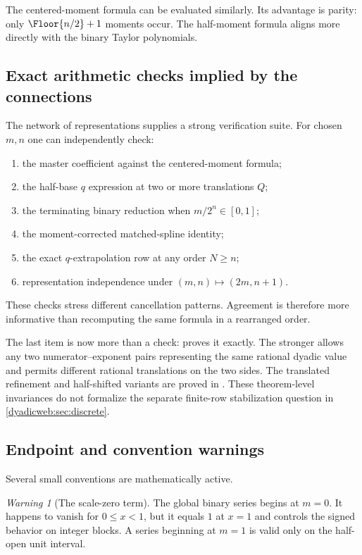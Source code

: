 \documentclass[11pt,oneside]{article}
\theoremstyle{definition}
\theoremstyle{remark}
\newtheorem{warning}[warning]{Warning}
\begin{document}
The centered-moment formula can be evaluated similarly.  Its advantage is parity: only
$\Floor{n/2}+1$ moments occur.  The half-moment formula aligns more directly with the
binary Taylor polynomials.

\subsection{Exact arithmetic checks implied by the connections}

The network of representations supplies a strong verification suite.  For chosen $m,n$ one
can independently check:
\begin{enumerate}
\item the master coefficient against the centered-moment formula;
\item the half-base $q$ expression at two or more translations $Q$;
\item the terminating binary reduction when $m/2^n\in[0,1]$;
\item the moment-corrected matched-spline identity;
\item the exact $q$-extrapolation row at any order $N\ge n$;
\item representation independence under $(m,n)\mapsto(2m,n+1)$.
\end{enumerate}
These checks stress different cancellation patterns.  Agreement is therefore more informative
than recomputing the same formula in a rearranged order.

The last item is now more than a check: 
proves it exactly.  The stronger
 allows any two
numerator--exponent pairs representing the same rational dyadic value and permits different
rational translations on the two sides.  The translated refinement and half-shifted variants
are proved in .  These theorem-level invariances do not
formalize the separate finite-row stabilization question in \cref{dyadicweb:sec:discrete}.

\subsection{Endpoint and convention warnings}

Several small conventions are mathematically active.

\begin{warning}[The scale-zero term]
The global binary series begins at $m=0$.  It happens to vanish for $0\le x<1$, but it equals
$1$ at $x=1$ and controls the signed behavior on integer blocks.  A series beginning at
$m=1$ is valid only on the half-open unit interval.
\end{warning}
\end{document}

